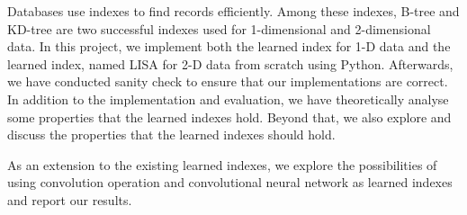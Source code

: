 Databases use indexes to find records efficiently. Among these indexes, B-tree and KD-tree are two successful indexes used for 1-dimensional and 2-dimensional data. In this project, we implement both the learned index \cite{kraska2018case} for 1-D data and the learned index, named LISA \cite{li2020lisa} for 2-D data from scratch using Python. Afterwards, we have conducted sanity check to ensure that our implementations are correct. In addition to the implementation and evaluation, we have theoretically analyse some properties that the learned indexes hold. Beyond that, we also explore and discuss the properties that the learned indexes should hold.

As an extension to the existing learned indexes, we explore the possibilities of using convolution operation and convolutional neural network as learned indexes and report our results. 